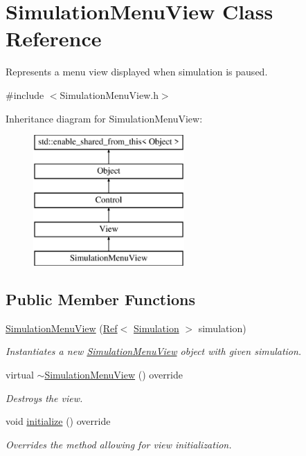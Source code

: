 \hypertarget{class_simulation_menu_view}{}\section{Simulation\+Menu\+View Class Reference}
\label{class_simulation_menu_view}


Represents a menu view displayed when simulation is paused.  




{\ttfamily \#include $<$Simulation\+Menu\+View.\+h$>$}

Inheritance diagram for Simulation\+Menu\+View\+:\begin{figure}[H]
\begin{center}
\leavevmode
\includegraphics[height=5.000000cm]{class_simulation_menu_view}
\end{center}
\end{figure}
\subsection*{Public Member Functions}
\begin{DoxyCompactItemize}
\item 
\mbox{\hyperlink{class_simulation_menu_view_a88384f9c473c357cd07240715708833f}{Simulation\+Menu\+View}} (\mbox{\hyperlink{class_ref}{Ref}}$<$ \mbox{\hyperlink{class_simulation}{Simulation}} $>$ simulation)
\begin{DoxyCompactList}\small\item\em Instantiates a new \mbox{\hyperlink{class_simulation_menu_view}{Simulation\+Menu\+View}} object with given simulation. \end{DoxyCompactList}\item 
virtual \mbox{\hyperlink{class_simulation_menu_view_adaea5ac31f43ed2cc652b1306f280990}{$\sim$\+Simulation\+Menu\+View}} () override
\begin{DoxyCompactList}\small\item\em Destroys the view. \end{DoxyCompactList}\item 
void \mbox{\hyperlink{class_simulation_menu_view_a6fe8f1da6cfa590491c735f6b41b6d87}{initialize}} () override
\begin{DoxyCompactList}\small\item\em Overrides the method allowing for view initialization. \end{DoxyCompactList}\end{DoxyCompactItemize}
